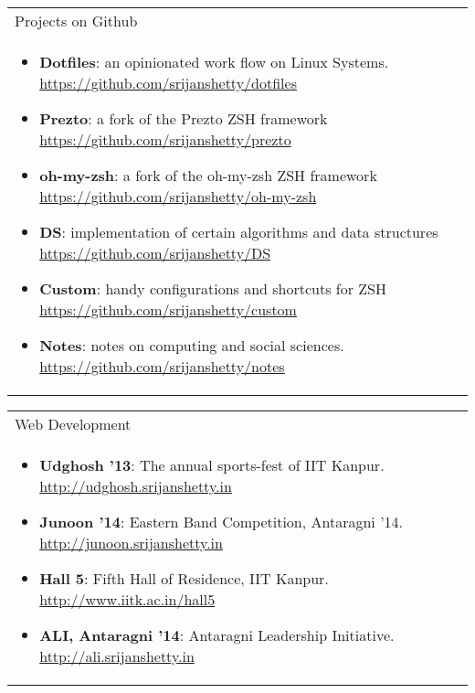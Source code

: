 \documentclass[a4paper,10pt]{article} %
\newcommand{\projectlist}[2]{
    \begin{tabular}{p{\linewidth}}
        \textcolor{NavyBlue}{#1}\\
        \vspace{-0.3cm}
        \footnotesize{#2}
    \end{tabular}
    \vspace{-0.4cm}
}
\begin{document}
\projectlist {Projects on Github}
             {
                 \begin{itemize}[leftmargin=0.5cm]
                     \item \textbf{Dotfiles}: an opinionated work flow on Linux Systems.
                         \href{https://github.com/srijanshetty/dotfiles} {https://github.com/srijanshetty/dotfiles}
                     \item \textbf{Prezto}: a fork of the Prezto ZSH framework
                         \href{https://github.com/srijanshetty/prezto} {https://github.com/srijanshetty/prezto}
                     \item \textbf{oh-my-zsh}: a fork of the oh-my-zsh ZSH framework
                         \href{https://github.com/srijanshetty/oh-my-zsh} {https://github.com/srijanshetty/oh-my-zsh}
                     \item \textbf{DS}: implementation of certain algorithms and data structures
                         \href{https://github.com/srijanshetty/DS} {https://github.com/srijanshetty/DS}
                     \item \textbf{Custom}: handy configurations and shortcuts for ZSH
                         \href{https://github.com/srijanshetty/custom} {https://github.com/srijanshetty/custom}
                     \item \textbf{Notes}: notes on computing and social sciences.
                         \href{https://github.com/srijanshetty/notes} {https://github.com/srijanshetty/notes}
                 \end{itemize}
             }

\projectlist {Web Development}
             {
                 \begin{itemize}[leftmargin=0.5cm]
                     \item \textbf{Udghosh '13}: The annual sports-fest of IIT Kanpur.
                         \href{http://udghosh.srijanshetty.in}{http://udghosh.srijanshetty.in}
                     \item \textbf{Junoon '14}: Eastern Band Competition, Antaragni '14.
                         \href{http://junoon.srijanshetty.in}{http://junoon.srijanshetty.in}
                     \item \textbf{Hall 5}: Fifth Hall of Residence, IIT Kanpur.
                         \href{http://www.iitk.ac.in/hall5} {http://www.iitk.ac.in/hall5}
                     \item \textbf{ALI, Antaragni '14}: Antaragni Leadership Initiative.
                         \href{http://ali.srijanshetty.in} {http://ali.srijanshetty.in}
                 \end{itemize}
             }
\end{document}
